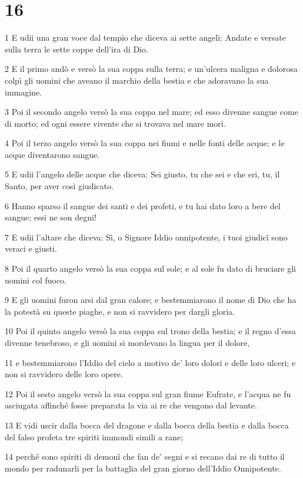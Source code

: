 \chapter{16}

\par 1 E udii una gran voce dal tempio che diceva ai sette angeli: Andate e versate sulla terra le sette coppe dell'ira di Dio.
\par 2 E il primo andò e versò la sua coppa sulla terra; e un'ulcera maligna e dolorosa colpì gli uomini che aveano il marchio della bestia e che adoravano la sua immagine.
\par 3 Poi il secondo angelo versò la sua coppa nel mare; ed esso divenne sangue come di morto; ed ogni essere vivente che si trovava nel mare morì.
\par 4 Poi il terzo angelo versò la sua coppa nei fiumi e nelle fonti delle acque; e le acque diventarono sangue.
\par 5 E udii l'angelo delle acque che diceva: Sei giusto, tu che sei e che eri, tu, il Santo, per aver così giudicato.
\par 6 Hanno sparso il sangue dei santi e dei profeti, e tu hai dato loro a bere del sangue; essi ne son degni!
\par 7 E udii l'altare che diceva: Sì, o Signore Iddio onnipotente, i tuoi giudicî sono veraci e giusti.
\par 8 Poi il quarto angelo versò la sua coppa sul sole; e al sole fu dato di bruciare gli uomini col fuoco.
\par 9 E gli uomini furon arsi dal gran calore; e bestemmiarono il nome di Dio che ha la potestà su queste piaghe, e non si ravvidero per dargli gloria.
\par 10 Poi il quinto angelo versò la sua coppa sul trono della bestia; e il regno d'essa divenne tenebroso, e gli uomini si mordevano la lingua per il dolore,
\par 11 e bestemmiarono l'Iddio del cielo a motivo de' loro dolori e delle loro ulceri; e non si ravvidero delle loro opere.
\par 12 Poi il sesto angelo versò la sua coppa sul gran fiume Eufrate, e l'acqua ne fu asciugata affinché fosse preparata la via ai re che vengono dal levante.
\par 13 E vidi uscir dalla bocca del dragone e dalla bocca della bestia e dalla bocca del falso profeta tre spiriti immondi simili a rane;
\par 14 perché sono spiriti di demonî che fan de' segni e si recano dai re di tutto il mondo per radunarli per la battaglia del gran giorno dell'Iddio Onnipotente.

